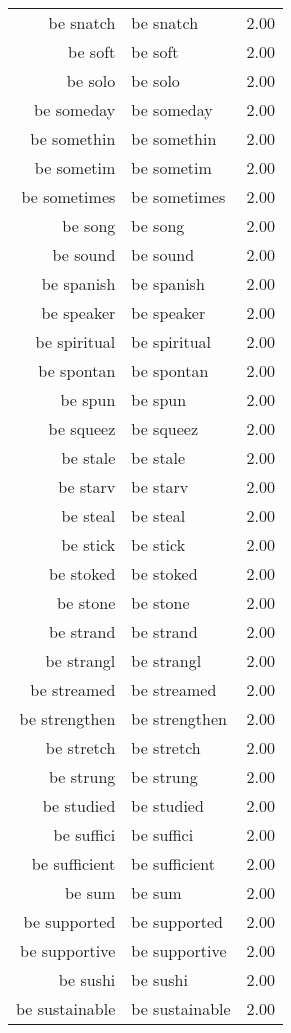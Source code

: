 \begin{table}[ht]
\begin{tabular}{rlr}
  be snatch & be snatch & 2.00 \\ 
  be soft & be soft & 2.00 \\ 
  be solo & be solo & 2.00 \\ 
  be someday & be someday & 2.00 \\ 
  be somethin & be somethin & 2.00 \\ 
  be sometim & be sometim & 2.00 \\ 
  be sometimes & be sometimes & 2.00 \\ 
  be song & be song & 2.00 \\ 
  be sound & be sound & 2.00 \\ 
  be spanish & be spanish & 2.00 \\ 
  be speaker & be speaker & 2.00 \\ 
  be spiritual & be spiritual & 2.00 \\ 
  be spontan & be spontan & 2.00 \\ 
  be spun & be spun & 2.00 \\ 
  be squeez & be squeez & 2.00 \\ 
  be stale & be stale & 2.00 \\ 
  be starv & be starv & 2.00 \\ 
  be steal & be steal & 2.00 \\ 
  be stick & be stick & 2.00 \\ 
  be stoked & be stoked & 2.00 \\ 
  be stone & be stone & 2.00 \\ 
  be strand & be strand & 2.00 \\ 
  be strangl & be strangl & 2.00 \\ 
  be streamed & be streamed & 2.00 \\ 
  be strengthen & be strengthen & 2.00 \\ 
  be stretch & be stretch & 2.00 \\ 
  be strung & be strung & 2.00 \\ 
  be studied & be studied & 2.00 \\ 
  be suffici & be suffici & 2.00 \\ 
  be sufficient & be sufficient & 2.00 \\ 
  be sum & be sum & 2.00 \\ 
  be supported & be supported & 2.00 \\ 
  be supportive & be supportive & 2.00 \\ 
  be sushi & be sushi & 2.00 \\ 
  be sustainable & be sustainable & 2.00 \\ 

\end{tabular}
\end{table}
